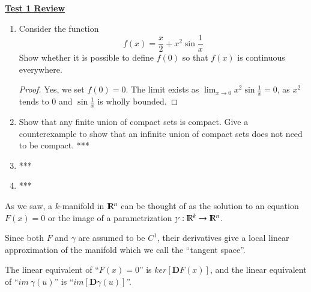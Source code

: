 
\ul{\textbf{Test 1 Review}}

\begin{enumerate}[1.]
  \item Consider the function
  \[f(x)=\frac{x}{2}+x^2\sin \frac{1}{x}\]
  Show whether it is possible to define $f(0)$ so that $f(x)$ is continuous everywhere.

  \begin{proof}
    Yes, we set $f(0) = 0$. The limit exists as $\lim_{x\to 0} x^2\sin\frac{1}{x}=0$, as $x^2$ tends to $0$ and $\sin\frac{1}{x}$ is wholly bounded.
  \end{proof}

  \item Show that any finite union of compact sets is compact. Give a counterexample to show that an infinite union of compact sets does not need to be compact. ***

  \item ***

  \item ***
\end{enumerate}


As we saw, a $k$-manifold in $\mathbb{R}^n$ can be thought of as the solution to an equation $F(x)=0$ or the image of a parametrization $\gamma : \mathbb{R}^k \to \mathbb{R}^{n}$.

Since both $F$ and $\gamma$ are assumed to be $C^1$, their derivatives give a local linear approximation of the manifold which we call the ``tangent space''.

The linear equivalent of ``$F(x)=0$'' is $ker[\bm{D}F(x)]$, and the linear equivalent of ``$im\ \gamma(u)$'' is ``$im[\bm{D}\gamma(u)]$''.


